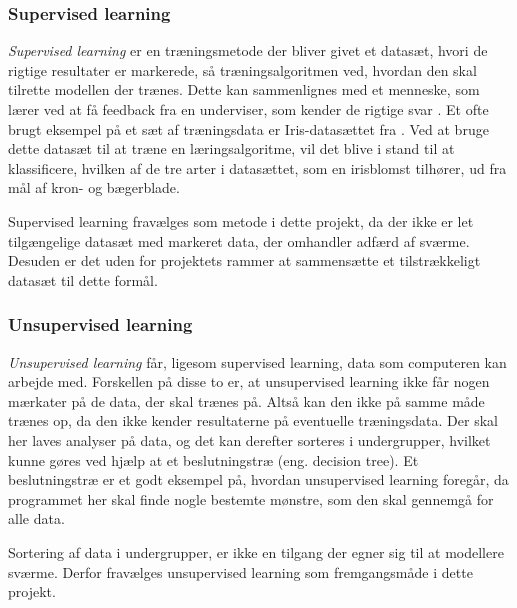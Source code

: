 \subsubsection{Supervised learning}
\textit{Supervised learning} er en træningsmetode der bliver givet et datasæt, hvori de rigtige resultater er markerede, så træningsalgoritmen ved, hvordan den skal tilrette modellen der trænes. Dette kan sammenlignes med et menneske, som lærer ved at få feedback fra en underviser, som kender de rigtige svar \citep{Jeanmonod2018}. Et ofte brugt eksempel på et sæt af træningsdata er Iris-datasættet fra \cite{fisher1936}. Ved at bruge dette datasæt til at træne en læringsalgoritme, vil det blive i stand til at klassificere, hvilken af de tre arter i datasættet, som en irisblomst tilhører, ud fra mål af kron- og bægerblade.
\par
Supervised learning fravælges som metode i dette projekt, da der ikke er let tilgængelige datasæt med markeret data, der omhandler adfærd af sværme. Desuden er det uden for projektets rammer at sammensætte et tilstrækkeligt datasæt til dette formål. 

\subsubsection{Unsupervised learning}
\textit{Unsupervised learning} får, ligesom supervised learning, data som computeren kan arbejde med. Forskellen på disse to er, at unsupervised learning ikke får nogen mærkater på de data, der skal trænes på. Altså kan den ikke på samme måde trænes op, da den ikke kender resultaterne på eventuelle træningsdata. Der skal her laves analyser på data, og det kan derefter sorteres i undergrupper, hvilket kunne gøres ved hjælp at et beslutningstræ (eng. decision tree). Et beslutningstræ er et godt eksempel på, hvordan unsupervised learning foregår, da programmet her skal finde nogle bestemte mønstre, som den skal gennemgå for alle data. 

Sortering af data i undergrupper, er ikke en tilgang der egner sig til at modellere sværme. Derfor fravælges unsupervised learning som fremgangsmåde i dette projekt.

